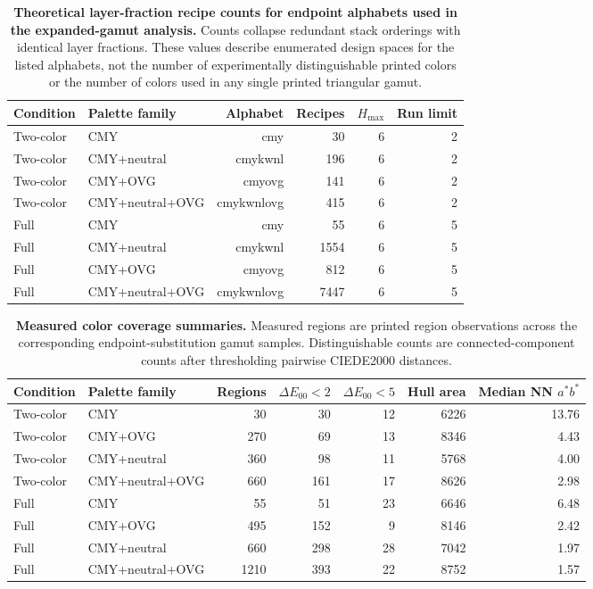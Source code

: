 \documentclass[preprint,12pt,authoryear]{elsarticle}
\begin{document}
\begin{table}[H]
\centering
\caption{\textbf{Theoretical layer-fraction recipe counts for endpoint alphabets used in the expanded-gamut analysis.}
Counts collapse redundant stack orderings with identical layer fractions. These values describe enumerated design spaces for the listed alphabets, not the number of experimentally distinguishable printed colors or the number of colors used in any single printed triangular gamut.}
\small
\begin{tabular}{llrrrr}
\toprule
Condition & Palette family & Alphabet & Recipes & \(H_{\max}\) & Run limit \\
\midrule
Two-color & CMY & cmy & 30 & 6 & 2 \\
Two-color & CMY+neutral & cmykwnl & 196 & 6 & 2 \\
Two-color & CMY+OVG & cmyovg & 141 & 6 & 2 \\
Two-color & CMY+neutral+OVG & cmykwnlovg & 415 & 6 & 2 \\
Full & CMY & cmy & 55 & 6 & 5 \\
Full & CMY+neutral & cmykwnl & 1554 & 6 & 5 \\
Full & CMY+OVG & cmyovg & 812 & 6 & 5 \\
Full & CMY+neutral+OVG & cmykwnlovg & 7447 & 6 & 5 \\
\bottomrule
\end{tabular}
\label{tab:supp-theoretical-counts}
\end{table}

\begin{table}[H]
\centering
\caption{\textbf{Measured color coverage summaries.}
Measured regions are printed region observations across the corresponding endpoint-substitution gamut samples. Distinguishable counts are connected-component counts after thresholding pairwise CIEDE2000 distances.}
\scriptsize
\setlength{\tabcolsep}{4pt}
\begin{tabular}{llrrrrr}
\toprule
Condition & Palette family & Regions & \(\Delta E_{00}<2\) & \(\Delta E_{00}<5\) & Hull area & Median NN \(a^*b^*\) \\
\midrule
Two-color & CMY & 30 & 30 & 12 & 6226 & 13.76 \\
Two-color & CMY+OVG & 270 & 69 & 13 & 8346 & 4.43 \\
Two-color & CMY+neutral & 360 & 98 & 11 & 5768 & 4.00 \\
Two-color & CMY+neutral+OVG & 660 & 161 & 17 & 8626 & 2.98 \\
Full & CMY & 55 & 51 & 23 & 6646 & 6.48 \\
Full & CMY+OVG & 495 & 152 & 9 & 8146 & 2.42 \\
Full & CMY+neutral & 660 & 298 & 28 & 7042 & 1.97 \\
Full & CMY+neutral+OVG & 1210 & 393 & 22 & 8752 & 1.57 \\
\bottomrule
\end{tabular}
\label{tab:supp-color-summary}
\end{table}
\end{document}
